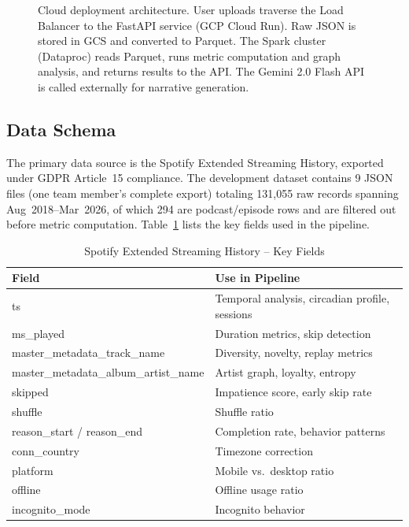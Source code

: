\documentclass[conference]{IEEEtran}
\begin{document}
\begin{figure}[t]
\caption{Cloud deployment architecture. User uploads traverse the Load Balancer to the FastAPI service (GCP Cloud Run). Raw JSON is stored in GCS and converted to Parquet. The Spark cluster (Dataproc) reads Parquet, runs metric computation and graph analysis, and returns results to the API. The Gemini 2.0 Flash API is called externally for narrative generation.}
\label{fig:deployment}
\end{figure}

\subsection{Data Schema}

The primary data source is the Spotify Extended Streaming History, exported under GDPR Article~15 compliance. The development dataset contains 9 JSON files (one team member's complete export) totaling 131{,}055 raw records spanning Aug~2018--Mar~2026, of which 294 are podcast/episode rows and are filtered out before metric computation. Table~\ref{tab:schema} lists the key fields used in the pipeline.

\begin{table}[ht]
\centering
\caption{Spotify Extended Streaming History -- Key Fields}
\label{tab:schema}
\renewcommand{\arraystretch}{1.2}
\begin{tabular}{>{\ttfamily}p{4.5cm} p{11.5cm}}
\toprule
\normalfont\textbf{Field} & \textbf{Use in Pipeline} \\
\midrule
ts & Temporal analysis, circadian profile, sessions \\
ms\_played & Duration metrics, skip detection \\
master\_metadata\_track\_name & Diversity, novelty, replay metrics \\
master\_metadata\_album\_artist\_name & Artist graph, loyalty, entropy \\
skipped & Impatience score, early skip rate \\
shuffle & Shuffle ratio \\
reason\_start / reason\_end & Completion rate, behavior patterns \\
conn\_country & Timezone correction \\
platform & Mobile vs.\ desktop ratio \\
offline & Offline usage ratio \\
incognito\_mode & Incognito behavior \\
\bottomrule
\end{tabular}
\end{table}
\end{document}
